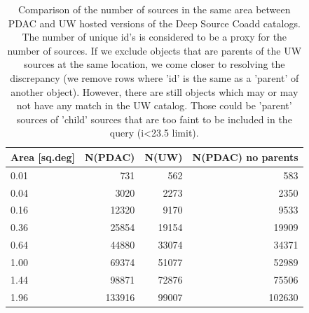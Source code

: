 \documentclass[DM,lsstdraft,toc,usenatbib]{lsstdoc}
\begin{document}
\begin{table}
\centering
\caption{Comparison of the number of sources in the same area between PDAC and UW hosted versions of the Deep Source Coadd catalogs. The number of unique id's is considered to be a proxy for the number of sources. If we exclude objects that are parents of the UW sources at the same location, we come closer to resolving  the discrepancy (we remove rows where   'id' is the same as a 'parent' of another object). However, there are still objects which may or may not have any match in the UW catalog. Those could be 'parent' sources of 'child' sources that are too faint to be included in the query (i<23.5 limit). }
\label{tab:source_count}
\begin{tabular}{ l|rrr} 
\hline
Area [sq.deg]  & N(PDAC)   & N(UW)  &  N(PDAC) no parents \\ 
\hline
0.01    & 731       & 562    &  583    \\
0.04    & 3020      & 2273   & 2350    \\
0.16    & 12320     & 9170   & 9533    \\
0.36    & 25854     & 19154  & 19909   \\
0.64    & 44880     & 33074  & 34371   \\
1.00    & 69374     & 51077  & 52989   \\
1.44    & 98871     & 72876  &  75506  \\
1.96    & 133916    & 99007  & 102630  \\
\end{tabular}
\end{table}



\end{document}
